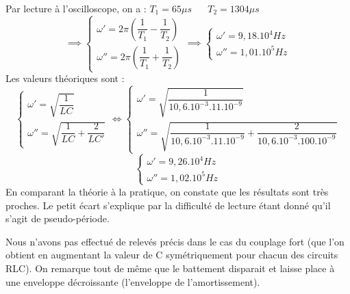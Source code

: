 \documentclass[12pt,a4paper]{article}
\begin{document}
	Par lecture à l'oscilloscope, on a :
	$T_1 = 65\mu s$ $\quad$ $T_2 = 1304\mu s$\\
	\begin{equation*}
	\implies 
	\begin{cases}
	\omega'=2\pi\left(\dfrac{1}{T_1}-\dfrac{1}{T_2}\right)\\[1em]
	\omega''=2\pi\left(\dfrac{1}{T_1}+\dfrac{1}{T_2}\right)
	\end{cases}
	\implies
	\begin{cases}
	\omega'=9,18.10^4Hz\\[1em]
	\omega''=1,01.10^5Hz
	\end{cases}
	\end{equation*}
	Les valeurs théoriques sont :
	\begin{equation*}
	\begin{cases}
	\omega'=\sqrt{\dfrac{1}{LC}}\\
	\omega''=\sqrt{\dfrac{1}{LC}+\dfrac{2}{LC'}}
	\end{cases}
	\iff
	\begin{cases}
	\omega'=\sqrt{\dfrac{1}{10,6.10^{-3}.11.10^{-9}}}\\
	\omega''=\sqrt{\dfrac{1}{10,6.10^{-3}.11.10^{-9}}+\dfrac{2}{10,6.10^{-3}.100.10^{-9}}}
	\end{cases}
	\end{equation*}
	\begin{equation*}
	\begin{cases}
	\omega'=9,26.10^4Hz\\
	\omega''=1,02.10^5Hz
	\end{cases}
	\end{equation*}
	En comparant la théorie à la pratique, on constate que les résultats sont très proches. Le petit écart s'explique par la difficulté de lecture étant donné qu'il s'agit de pseudo-période.
	
	Nous n'avons pas effectué de relevés précis dans le cas du couplage fort (que l'on obtient en augmentant la valeur de C symétriquement pour chacun des circuits RLC). On remarque tout de même que le battement disparait et laisse place à une enveloppe décroissante (l'enveloppe de l'amortissement).
\end{document}
